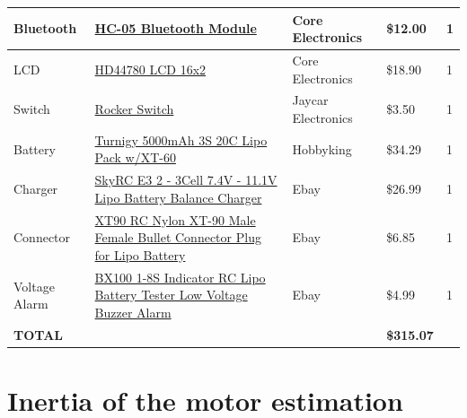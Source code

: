 \documentclass{UoNMCHA}
\numberwithin{equation}{section}
\begin{document}
\begin{table}[!h]
{\begin{tabular}{|l|l|l|l|l|}
			Bluetooth         & \href{https://core-electronics.com.au/bluetooth-module-hc-05.html}{HC-05 Bluetooth Module}                                               & Core Electronics        & \$12.00                        & 1                 \\ \hline
			LCD               & \href{https://core-electronics.com.au/standard-lcd-16x2-extras-white-on-blue.html}{HD44780 LCD 16x2}                                                       & Core Electronics        & \$18.90                        & 1                 \\ \hline
			Switch            & \href{https://www.jaycar.com.au/rocker-switch-illuminated-green-spst-15a-240vac/p/SK0979}{Rocker Switch}                                                          & Jaycar Electronics      & \$3.50                         & 1                 \\ \hline
			Battery           & \href{https://hobbyking.com/en_us/turnigy-5000mah-3s-20c-lipo-pack-xt-90.html?___store=en_us}{Turnigy 5000mAh 3S 20C Lipo Pack w/XT-60}                               & Hobbyking               & \$34.29                        & 1                 \\ \hline
			Charger           & \href{https://tinyurl.com/yd88ryr7}{SkyRC E3 2 - 3Cell 7.4V - 11.1V Lipo Battery Balance Charger}           & Ebay                    & \$26.99                        & 1                 \\ \hline
			Connector         & \href{https://tinyurl.com/y8hshlhf}{XT90 RC Nylon XT-90 Male Female Bullet Connector Plug for Lipo Battery} & Ebay                    & \$6.85                         & 1                 \\ \hline
			Voltage Alarm     & \href{https://tinyurl.com/y7k3g3km}{BX100 1-8S Indicator RC Lipo Battery Tester Low Voltage Buzzer Alarm}   & Ebay                    & \$4.99                         & 1                 \\ \hline
			\textbf{TOTAL}    & \textbf{}                                                              & \textbf{}               & \textbf{\$315.07}              & \textbf{}         \\ \hline
		\end{tabular}%
	}
\end{table}

\section{Inertia of the motor estimation}\label{JsysID}
\end{document}
